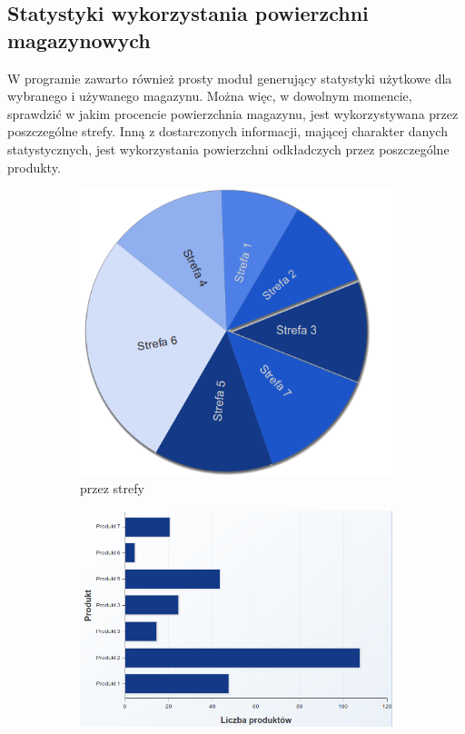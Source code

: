 	\subsection{Statystyki wykorzystania powierzchni magazynowych}
		W programie zawarto również prosty moduł generujący statystyki użytkowe dla wybranego i używanego magazynu.
		Można więc, w dowolnym momencie, sprawdzić w jakim procencie powierzchnia magazynu, jest wykorzystywana przez
		poszczególne strefy. Inną z dostarczonych informacji, mającej charakter danych statystycznych, jest 
		wykorzystania powierzchni odkładczych przez poszczególne produkty. 
		\begin{figure}[H]
			\centering  
			\begin{subfigure}[b]{0.75\textwidth}
                \centering
                \includegraphics[width=\textwidth]{images/app/stat_pie}
                \caption{przez strefy}
			\label{c7:fig:app:stat_unit_pie}
       		\end{subfigure}
			\begin{subfigure}[b]{0.75\textwidth}
                \centering
                \includegraphics[width=\textwidth]{images/app/stat_bar}

\end{subfigure}
\end{figure}

